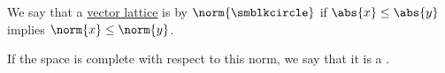 \begin{definition}\label{def:normed_vector_lattice}
  We say that a \hyperref[def:ordered_vector_space]{vector lattice} is  by \( \norm{\anon} \) if \( \abs{x} \leq \abs{y} \) implies \( \norm{x} \leq \norm{y} \).

  If the space is complete with respect to this norm, we say that it is a .
\end{definition}
